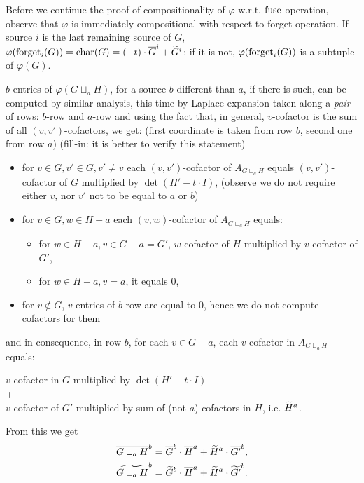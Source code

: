 Before we continue the proof of compositionality of $\varphi$ w.r.t. $\operatorname{fuse}$ operation, observe that $\varphi$ is immediately compositional with respect to forget operation. If source $i$ is the last remaining source of $G$, $\varphi(\operatorname{forget}_i(G)) = \operatorname{char}(G) = (-t)\cdot\overline{G}^{i} + \widetilde{G}^{i}$; if it is not, $\varphi(\operatorname{forget}_i(G))$ is a subtuple of $\varphi(G)$.

$b$-entries of $\varphi(G \sqcup_aH)$, for a source $b$ different than $a$, if there is such, can be computed by similar analysis, this time by Laplace expansion taken along a \emph{pair} of rows: $b$-row and $a$-row and using the fact that, in general, $v$-cofactor is the sum of all $(v, v')$-cofactors, %
 we get: (first coordinate is taken from row $b$, second one from row $a$) (fill-in: it is better to verify this statement)
\begin{itemize}
	\item for $v \in G, v' \in G, v' \neq v$ each $(v, v')$-cofactor of $A_{G\sqcup_a H}$ equals $(v, v')$-cofactor of $G$ multiplied by $\det(H' - t\cdot I)$,  (observe we do not require either $v$, nor $v'$ not to be equal to $a$ or $b$)
	\item for $v \in G, w \in H-a$ each $(v,w)$-cofactor of $A_{G\sqcup_a H}$ equals:
	\begin{itemize}
		\item for $w \in H-a, v \in G-a = G'$, $w$-cofactor of $H$ multiplied by $v$-cofactor of $G'$,
		\item for $w \in H-a, v = a$, it equals 0,
	\end{itemize}
	\item for $v \notin G$, $v$-entries of $b$-row are equal to 0, hence we do not compute cofactors for them
\end{itemize}
and in consequence,
in row $b$, for each $v\in G-a$, each $v$-cofactor in $A_{G\sqcup_a H}$ equals:
\begin{center}
	$v$-cofactor in $G$ multiplied by $\det(H' - t\cdot I)$\\
	+\\
	$v$-cofactor of $G'$ multiplied by sum of (not $a$)-cofactors in $H$, i.e. $\widetilde{H}^{a}$.
\end{center}
 From this we get
\begin{align*}
	&\overline{G\sqcup_a H}^{b} = \overline{G}^{b} \cdot \overline{H}^{a} + \widetilde{H}^{a} \cdot \overline{G'}^{b},\\
	&\widetilde{G\sqcup_a H}^{b} = \widetilde{G}^{b} \cdot \overline{H}^{a} + \widetilde{H}^{a} \cdot \widetilde{G'}^{b}.
\end{align*}
